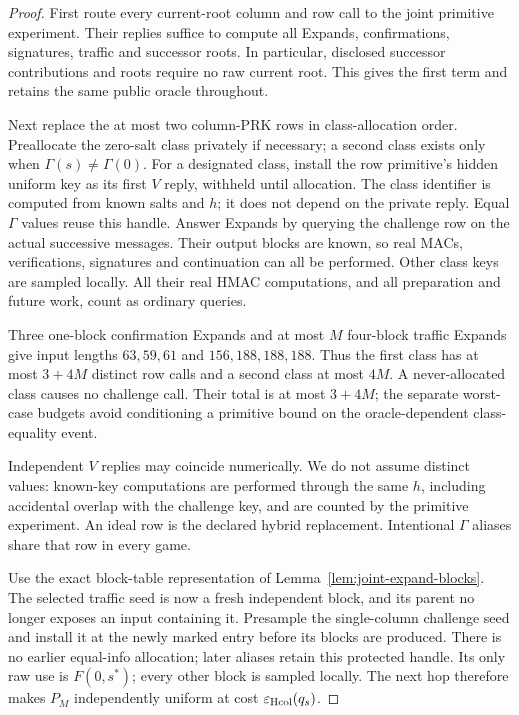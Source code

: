 \documentclass[pdflatex]{sn-jnl}
\theoremstyle{thmstyleone}
\theoremstyle{thmstylethree}
\theoremstyle{thmstyletwo}
\begin{document}
\begin{proof}
First route every current-root column and row call to the joint primitive
experiment. Their replies suffice to compute all Expands, confirmations,
signatures, traffic and successor roots. In particular, disclosed successor
contributions and roots require no raw current root. This gives the first
term and retains the same public oracle throughout.

Next replace the at most two column-PRK rows in class-allocation order.
Preallocate the zero-salt class privately if necessary; a second class
exists only when $\Gamma(s)\ne\Gamma(0)$. For a designated class, install
the row primitive's hidden uniform key as its first $V$ reply, withheld
until allocation. The class identifier is computed from known salts and $h$;
it does not depend on the private reply. Equal $\Gamma$ values reuse this
handle. Answer Expands by querying the challenge row on the actual
successive messages. Their output blocks are known, so real MACs,
verifications, signatures and continuation can all be performed.
Other class keys are sampled locally. All their real HMAC computations,
and all preparation and future work, count as ordinary queries.

Three one-block confirmation Expands and at most $M$ four-block traffic
Expands give input lengths $63,59,61$ and $156,188,188,188$. Thus the
first class has at most $3+4M$ distinct row calls and a second class at most
$4M$. A never-allocated class causes no challenge call. Their total is at
most $3+4M$; the separate worst-case budgets avoid conditioning a
primitive bound on the oracle-dependent class-equality event.

Independent $V$ replies may coincide numerically. We do not assume distinct values:
known-key computations are performed through the same $h$, including
accidental overlap with the challenge key, and are counted by the
primitive experiment. An ideal row is the declared hybrid replacement.
Intentional $\Gamma$ aliases share that row in every game.

Use the exact block-table representation of Lemma~\ref{lem:joint-expand-blocks}.
The selected traffic seed
is now a fresh independent block, and its parent no longer exposes an
input containing it. Presample the single-column challenge seed and
install it at the newly marked entry before its blocks are produced.
There is no earlier equal-info allocation; later aliases retain this
protected handle.
Its only raw use is $F(0,s^*)$; every other block is sampled locally.
The next hop therefore makes $P_M$ independently uniform at cost
$\varepsilon_{\rm Hcol}(q_s)$.


\end{proof}
\end{document}
